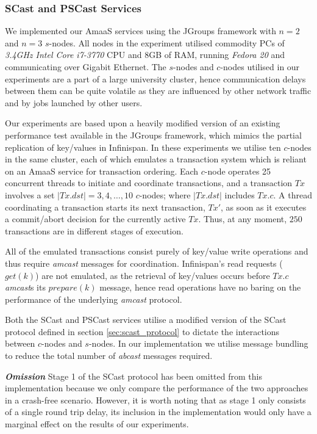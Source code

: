 	\subsubsection*{\textsf{SCast} and \textsf{PSCast} Services}
	We implemented our \textsf{AmaaS} services using the JGroups\citep{JGroups} framework with $n=2$ and $n=3$ $s$-nodes.  All nodes in the experiment utilised commodity PCs of \emph{3.4GHz Intel Core i7-3770} CPU and 8GB of RAM, running \emph{Fedora 20} and communicating over Gigabit Ethernet. The $s$-nodes and $c$-nodes utilised in our experiments are a part of a large university cluster, hence communication delays between them can be quite volatile as they are influenced by other network traffic and by jobs launched by other users.
	
	Our experiments are based upon a heavily modified version of an existing performance test available in the JGroups\citep{JGroups} framework, which mimics the partial replication of key/values in Infinispan\citep{Infinispan}.  In these experiments we utilise ten $c$-nodes in the same cluster, each of which emulates a transaction system which is reliant on an \textsf{AmaaS} service for transaction ordering.  Each $c$-node operates 25 concurrent threads to initiate and coordinate transactions, and a transaction $Tx$ involves a set $|Tx.dst| = 3,4,\ldots,10$ $c$-nodes; where $|Tx.dst|$ includes $Tx.c$. A thread coordinating a transaction starts its next transaction, $Tx'$, as soon as it executes a commit/abort decision for the currently active $Tx$. Thus, at any moment, $250$ transactions are in different stages of execution.  
	
	All of the emulated transactions consist purely of key/value write operations and thus require \emph{amcast} messages for coordination.  Infinispan's read requests ($get(k)$) are not emulated, as the retrieval of key/values occurs before $Tx.c$ \emph{amcast}s its $prepare(k)$ message, hence read operations have no baring on the performance of the underlying \emph{amcast} protocol.  
	
	Both the \textsf{SCast} and \textsf{PSCast} services utilise a modified version of the \textsf{SCast} protocol defined in section \ref{sec:scast_protocol} to dictate the interactions between $c$-nodes and $s$-nodes.  In our implementation we utilise message bundling to reduce the total number of \emph{abcast} messages required.  
	
    \textbf{\emph{Omission}} Stage 1 of the \textsf{SCast} protocol has been omitted from this implementation because we only compare the performance of the two approaches in a crash-free scenario.  However, it is worth noting that as stage 1 only consists of a single round trip delay, its inclusion in the implementation would only have a marginal effect on the results of our experiments.  	
	
